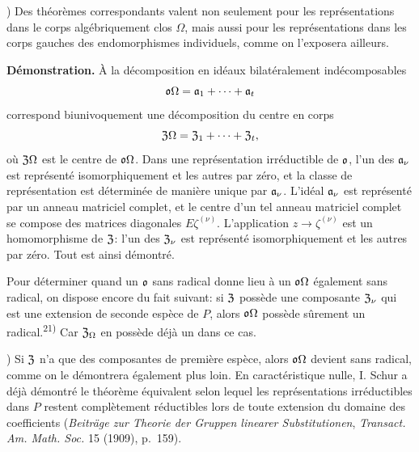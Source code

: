 {\footnotesize{}) Des théorèmes correspondants valent non seulement pour les représentations dans le corps algébriquement clos $\Omega$, mais aussi pour les représentations dans les corps gauches des endomorphismes individuels, comme on l'exposera ailleurs.\par}

\textbf{Démonstration.} À la décomposition en idéaux bilatéralement indécomposables
\[
        \mathfrak{o}\Omega=\mathfrak{a}_1+\cdots+\mathfrak{a}_t
\]
correspond biunivoquement une décomposition du centre en corps
\[
        \mathfrak{Z}\Omega=\mathfrak{Z}_1+\cdots+\mathfrak{Z}_t,
\]
où $\mathfrak{Z}\Omega$ est le centre de $\mathfrak{o}\Omega$. Dans une représentation irréductible de $\mathfrak{o}$, l'un des $\mathfrak{a}_\nu$ est représenté isomorphiquement et les autres par zéro, et la classe de représentation est déterminée de manière unique par $\mathfrak{a}_\nu$. L'idéal $\mathfrak{a}_\nu$ est représenté par un anneau matriciel complet, et le centre d'un tel anneau matriciel complet se compose des matrices diagonales $E\zeta^{(\nu)}$. L'application $z\to\zeta^{(\nu)}$ est un homomorphisme de $\mathfrak{Z}$: l'un des $\mathfrak{Z}_\nu$ est représenté isomorphiquement et les autres par zéro. Tout est ainsi démontré.

Pour déterminer quand un $\mathfrak{o}$ sans radical donne lieu à un $\mathfrak{o}\Omega$ également sans radical, on dispose encore du fait suivant: si $\mathfrak{Z}$ possède une composante $\mathfrak{Z}_\nu$ qui est une extension de seconde espèce de $P$, alors $\mathfrak{o}\Omega$ possède sûrement un radical.\textsuperscript{21)} Car $\mathfrak{Z}_\Omega$ en possède déjà un dans ce cas.

{\footnotesize{}) Si $\mathfrak{Z}$ n'a que des composantes de première espèce, alors $\mathfrak{o}\Omega$ devient sans radical, comme on le démontrera également plus loin. En caractéristique nulle, I. Schur a déjà démontré le théorème équivalent selon lequel les représentations irréductibles dans $P$ restent complètement réductibles lors de toute extension du domaine des coefficients (\emph{Beiträge zur Theorie der Gruppen linearer Substitutionen}, \emph{Transact. Am. Math. Soc.} 15 (1909), p.~159).\par}

